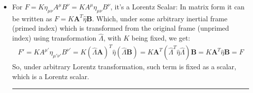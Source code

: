 \documentclass{article}
\begin{document}
\begin{itemize}
    \rule{15.6cm}{0,1mm}

    \item For $F=K \eta_{\mu\nu}A^\mu B^\nu = KA^\mu \eta_{\mu\nu}B^\nu$, it's a Lorentz Scalar: In matrix form it can be written as $F=K\textbf{A}^T\hat{\eta}\textbf{B}$. Which, under some arbitrary inertial frame (primed index) which is transformed from the original frame (unprimed index) using transformation $\hat{\Lambda}$, with $K$ being fixed, we get:
    \begin{align}
        F' = KA^{\mu'}\eta_{\mu'\nu'}B^{\nu'} = K(\hat{\Lambda}\textbf{A})^T\hat{\eta}(\hat{\Lambda}\textbf{B}) = K\textbf{A}^T(\hat{\Lambda}^T\hat{\eta}\hat{\Lambda})\textbf{B} = K\textbf{A}^T\hat{\eta}\textbf{B} = F
    \end{align}
    So, under arbitrary Lorentz transformation, such term is fixed as a scalar, which is a Lorentz scalar.

    \rule{15.6cm}{0,1mm}


\end{itemize}
\end{document}
